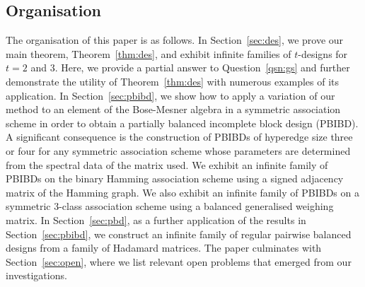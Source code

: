 \documentclass[11pt]{article}
\begin{document}
\subsection{Organisation}

The organisation of this paper is as follows. 
In Section~\ref{sec:des}, we prove our main theorem, Theorem~\ref{thm:des}, and exhibit infinite families of $t$-designs for $t=2$
and $3$. 
Here, we provide a partial answer to Question~\ref{qsn:gs} and further demonstrate the utility of Theorem~\ref{thm:des} with numerous examples of its application.
In Section~\ref{sec:pbibd}, 
we show how to apply a variation of our method to an element of the Bose-Mesner algebra in a symmetric association scheme in order to obtain a partially balanced incomplete block design (PBIBD). 
A significant consequence is the construction of PBIBDs of hyperedge size three or four for any symmetric association scheme whose parameters are determined from the spectral data of the matrix used. 
We exhibit an infinite family of PBIBDs on the binary Hamming association scheme using a signed adjacency matrix of the Hamming graph. 
We also exhibit an infinite family of PBIBDs on a symmetric $3$-class association scheme using a balanced generalised weighing matrix. 
In Section~\ref{sec:pbd}, as a further application of the results in Section~\ref{sec:pbibd}, we construct an infinite family of regular pairwise balanced designs from a family of Hadamard matrices. 
The paper culminates with Section~\ref{sec:open}, where we list relevant open problems that emerged from our investigations.
\end{document}
